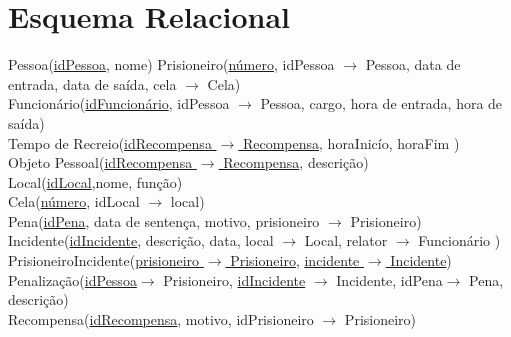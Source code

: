 \documentclass{article}
\begin{document}
\section{Esquema Relacional}
Pessoa(\underline{idPessoa}, nome)
Prisioneiro(\underline{número}, idPessoa $\rightarrow$ Pessoa, data de entrada, data de saída, cela $\rightarrow$ Cela)\\
Funcionário(\underline{idFuncionário}, idPessoa $\rightarrow$ Pessoa, cargo, hora de entrada, hora de saída)\\
Tempo de Recreio(\underline{idRecompensa $\rightarrow$ Recompensa}, horaInicío, horaFim )\\
Objeto Pessoal(\underline{idRecompensa $\rightarrow$ Recompensa}, descrição)\\
Local(\underline{idLocal},nome, função)\\
Cela(\underline{número}, idLocal $\rightarrow$ local)\\
Pena(\underline{idPena}, data de sentença, motivo, prisioneiro $\rightarrow$ Prisioneiro)\\
Incidente(\underline{idIncidente}, descrição, data, local $\rightarrow$ Local, relator $\rightarrow$ Funcionário )\\
PrisioneiroIncidente(\underline{prisioneiro $\rightarrow$ Prisioneiro}, \underline{incidente $\rightarrow$ Incidente})\\
Penalização(\underline{idPessoa}$\rightarrow$ Prisioneiro, \underline{idIncidente} $\rightarrow$ Incidente, {idPena}$\rightarrow$ Pena, descrição)\\
Recompensa(\underline{idRecompensa}, motivo, idPrisioneiro $\rightarrow$ Prisioneiro)\\








	
\end{document}

